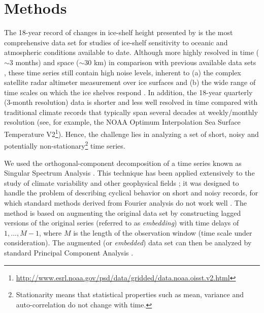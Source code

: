 \section{Methods}

\noindent
The 18-year record of changes in ice-shelf height presented by \textcite{Paolo2015, Paolo2015a} is the most comprehensive data set for studies of ice-shelf sensitivity to oceanic and atmospheric conditions available to date. Although more highly resolved in time ($\sim$3 months) and space ($\sim$30 km) in comparison with previous available data sets \parencite[e.g.,][]{Shepherd2010, Pritchard2012}, these time series still contain high noise levels, inherent to (a) the complex satellite radar altimeter measurement over ice surfaces \parencite{Paolo2015a, Davis1993, Arthern2001, Wingham2010, Remy2012} and (b) the wide range of time scales on which the ice shelves respond \parencite{Paolo2015a, Padman2003, Holland2015, Dutrieux2014}. In addition, the 18-year quarterly (3-month resolution) data is shorter and less well resolved in time compared with traditional climate records that typically span several decades at weekly/monthly resolution (see, for example, the NOAA Optimum Interpolation Sea Surface Temperature V2\footnote{\url{http://www.esrl.noaa.gov/psd/data/gridded/data.noaa.oisst.v2.html}}). Hence, the challenge lies in analyzing a set of short, noisy and potentially non-stationary\footnote{Stationarity means that statistical properties such as mean, variance and auto-correlation do not change with time.} time series.

We used the orthogonal-component decomposition of a time series known as Singular Spectrum Analysis \parencite[SSA;][]{Vautard1992, Golyandina2013, Elsner1996}. This technique has been applied extensively to the study of climate variability and other geophysical fields \parencite[][and references therein]{Ghil2002}; it was designed to handle the problem of describing cyclical behavior on short and noisy records, for which standard methods derived from Fourier analysis do not work well \parencite{Vautard1989, Ghil1991, Vautard1992, Groth2011}. The method is based on augmenting the original data set by constructing lagged versions of the original series (referred to as \emph{embedding}) with time delays of $1,...,M-1$, where $M$ is the length of the observation window (time scale under consideration). The augmented (or \emph{embedded}) data set can then be analyzed by standard Principal Component Analysis \parencite[PCA;][]{Jolliffe2002}.

